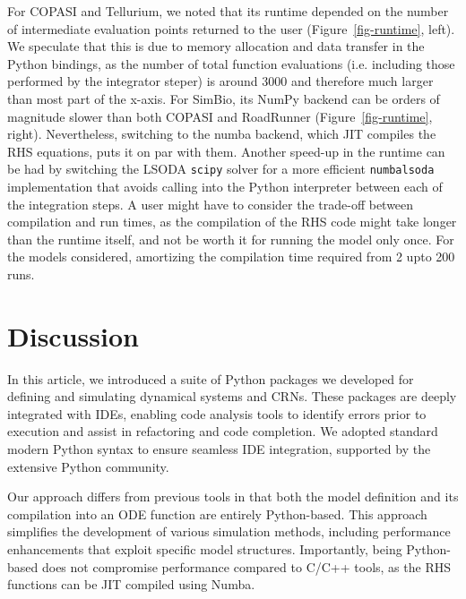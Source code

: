 \documentclass[namedate,numsec,webpdf,modern,large]{oup-authoring-template}
\theoremstyle{thmstyleone}%
\theoremstyle{thmstyletwo}%
\theoremstyle{thmstylethree}%
\begin{document}
For COPASI and Tellurium,
we noted that its runtime depended on the number of intermediate evaluation points returned to the user (Figure~\ref{fig-runtime}, left).
We speculate that this is due to memory allocation and data transfer in the Python bindings, 
as the number of total function evaluations (i.e. including those performed by the integrator steper)
is around 3000 and therefore much larger than most part of the x-axis.
For SimBio,
its NumPy backend can be orders of magnitude slower than both COPASI and RoadRunner  (Figure~\ref{fig-runtime}, right).
Nevertheless, switching to the numba backend,
which \ac{JIT} compiles the \ac{RHS} equations,
puts it on par with them.
Another speed-up in the runtime can be had by switching the LSODA \texttt{scipy} solver
for a more efficient \texttt{numbalsoda} implementation that avoids calling into the Python interpreter
between each of the integration steps.
A user might have to consider the trade-off between compilation and run times,
as the compilation of the \ac{RHS} code might take longer than the runtime itself,
and not be worth it for running the model only once.
For the models considered,
amortizing the compilation time required from 2 upto 200 runs.


\section{Discussion}\label{discussion}

In this article,
we introduced a suite of Python packages we developed
for defining and simulating dynamical systems and \acp{CRN}.
These packages are deeply integrated with \acp{IDE},
enabling code analysis tools to identify errors prior to execution
and assist in refactoring and code completion.
We adopted standard modern Python syntax to ensure seamless IDE integration,
supported by the extensive Python community.

Our approach differs from previous tools in that both the model
definition and its compilation into an \ac{ODE} function are entirely Python-based.
This approach simplifies the development of various simulation methods,
including performance enhancements that exploit specific model structures.
Importantly, being Python-based does not compromise performance compared to C/C++ tools,
as the \ac{RHS} functions can be \ac{JIT} compiled using Numba.
\end{document}
